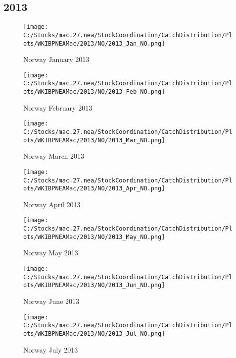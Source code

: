 \documentclass{article}
\begin{document}
\subsection{2013}



\begin{figure}[h]
	\centering
		\texttt{[image: C:/Stocks/mac.27.nea/StockCoordination/CatchDistribution/Plots/WKIBPNEAMac/2013/NO/2013\_Jan\_NO.png]}
	\caption{Norway January 2013}
	\label{fig:2013_Jan_NO}
\end{figure}

\begin{figure}
	\centering
		\texttt{[image: C:/Stocks/mac.27.nea/StockCoordination/CatchDistribution/Plots/WKIBPNEAMac/2013/NO/2013\_Feb\_NO.png]}
	\caption{Norway February 2013}
	\label{fig:2013_Feb_NO}
\end{figure}

\begin{figure}
	\centering
		\texttt{[image: C:/Stocks/mac.27.nea/StockCoordination/CatchDistribution/Plots/WKIBPNEAMac/2013/NO/2013\_Mar\_NO.png]}
	\caption{Norway March 2013}
	\label{fig:2013_Mar_NO}
\end{figure}

\begin{figure}
	\centering
		\texttt{[image: C:/Stocks/mac.27.nea/StockCoordination/CatchDistribution/Plots/WKIBPNEAMac/2013/NO/2013\_Apr\_NO.png]}
	\caption{Norway April 2013}
	\label{fig:2013_Apr_NO}
\end{figure}

\begin{figure}
	\centering
		\texttt{[image: C:/Stocks/mac.27.nea/StockCoordination/CatchDistribution/Plots/WKIBPNEAMac/2013/NO/2013\_May\_NO.png]}
	\caption{Norway May 2013}
	\label{fig:2013_May_NO}
\end{figure}

\begin{figure}
	\centering
		\texttt{[image: C:/Stocks/mac.27.nea/StockCoordination/CatchDistribution/Plots/WKIBPNEAMac/2013/NO/2013\_Jun\_NO.png]}
	\caption{Norway June 2013}
	\label{fig:2013_Jun_NO}
\end{figure}

\begin{figure}
	\centering
		\texttt{[image: C:/Stocks/mac.27.nea/StockCoordination/CatchDistribution/Plots/WKIBPNEAMac/2013/NO/2013\_Jul\_NO.png]}
	\caption{Norway July 2013}
	\label{fig:2013_Jul_NO}
\end{figure}
\end{document}

